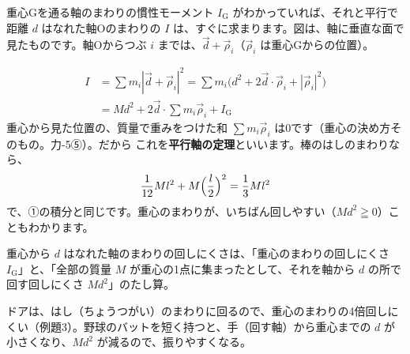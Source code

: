 \label{ph:力-6:heikoujiku}
\noindent\begin{minipage}[c]{0.4\linewidth}
\centering
{}
\end{minipage}\hfill
\begin{minipage}[c]{0.56\linewidth}
重心Gを通る軸のまわりの慣性モーメント $I_{\mathrm G}$ がわかっていれば、それと平行で距離 $d$ はなれた軸Oのまわりの $I$ は、すぐに求まります。図は、軸に垂直な面で見たものです。軸Oからつぶ $i$ までは、$\vec d+\vec\rho_i$（$\vec\rho_i$ は重心Gからの位置）。
\end{minipage}
\begin{align*}
I&=\sum m_i|\vec d+\vec\rho_i|^2=\sum m_i\bigl(d^2+2\vec d\cdot\vec\rho_i+|\vec\rho_i|^2\bigr)\\
&=Md^2+2\vec d\cdot\sum m_i\vec\rho_i+I_{\mathrm G}
\end{align*}
重心から見た位置の、質量で重みをつけた和 $\sum m_i\vec\rho_i$ は0です（重心の決め方そのもの。力-5⑤）。だから
これを\textbf{平行軸の定理}といいます。棒のはしのまわりなら、
\[ \frac{1}{12}Ml^2+M\Bigl(\frac{l}{2}\Bigr)^2=\frac{1}{3}Ml^2 \]
で、①の積分と同じです。重心のまわりが、いちばん回しやすい（$Md^2\geqq0$）こともわかります。
\begin{phyomi}[$I=I_{\mathrm G}+Md^2$]
重心から $d$ はなれた軸のまわりの回しにくさは、「重心のまわりの回しにくさ $I_{\mathrm G}$」と、「全部の質量 $M$ が重心の1点に集まったとして、それを軸から $d$ の所で回す回しにくさ $Md^2$」のたし算。
\end{phyomi}
\begin{phmijika}[ドアとバット]
ドアは、はし（ちょうつがい）のまわりに回るので、重心のまわりの4倍回しにくい（例題3）。野球のバットを短く持つと、手（回す軸）から重心までの $d$ が小さくなり、$Md^2$ が減るので、振りやすくなる。
\end{phmijika}

